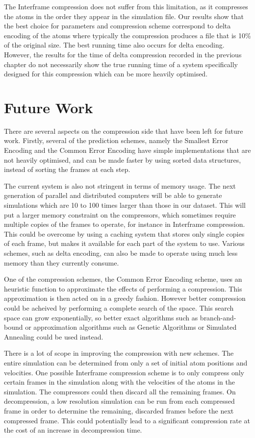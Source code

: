 \documentclass[a4paper,11pt]{report}
\begin{document}
The Interframe compression does not suffer from this limitation, as it compresses the atoms in the order they appear in the simulation file. Our results show that the best choice for parameters and compression scheme correspond to delta encoding of the atoms where typically the compression produces a file that is 10\% of the original size. The best running time also occurs for delta encoding. However, the results for the time of delta compression recorded in the previous chapter do not necessarily show the true running time of a system specifically designed for this compression which can be more heavily optimised. 

\section{Future Work}

There are several aspects on the compression side that have been left for future work. Firstly, several of the prediction schemes, namely the Smallest Error Encoding and the Common Error Encoding have simple implementations that are not heavily optimised, and can be made faster by using sorted data structures, instead of sorting the frames at each step. 

The current system is also not stringent in terms of memory usage. The next generation of parallel and distributed computers will be able to generate simulations which are 10 to 100 times larger than those in our dataset. This will put a larger memory constraint on the compressors, which sometimes require multiple copies of the frames to operate, for instance in Interframe compression. This could be overcome by using a caching system that stores only single copies of each frame, but makes it available for each part of the system to use. Various schemes, such as delta encoding, can also be made to operate using much less memory than they currently consume.

One of the compression schemes, the Common Error Encoding scheme, uses an heuristic function to approximate the effects of performing a compression. This approximation is then acted on in a greedy fashion. However better compression could be acheived by performing a complete search of the space. This search space can grow exponentially, so better exact algorithms such as branch-and-bound or approximation algorithms such as Genetic Algorithms or Simulated Annealing could be used instead.

There is a lot of scope in improving the compression with new schemes. The entire simulation can be determined from only a set of initial atom positions and velocities. One possible Interframe compression scheme is to only compress only certain frames in the simulation along with the velocities of the atoms in the simulation. The compressors could then discard all the remaining frames. On decompression, a low resolution simulation can be run from each compressed frame in order to determine the remaining, discarded frames before the next compressed frame. This could potentially lead to a significant compression rate at the cost of an increase in decompression time.
\end{document}
